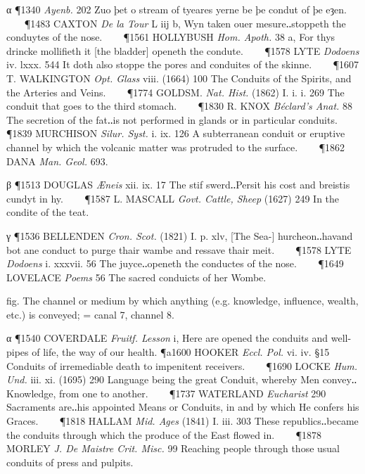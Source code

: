 \begin{description}[wide, labelwidth=!, labelindent=0pt]
\begin{myenumerate}
\noindent α \P 1340  \textit{Ayenb.} 202 Zuo þet o stream of tyeares yerne be þe condut of þe eȝen.    
\P 1483 CAXTON  \textit{De la Tour} L iij b, Wyn taken ouer mesure‥stoppeth the conduytes of the nose.    
\P 1561 HOLLYBUSH  \textit{Hom. Apoth.} 38 a, For thys drincke mollifieth it [the bladder] openeth the condute.    
\P 1578 LYTE  \textit{Dodoens} iv. lxxx. 544 It doth also stoppe the pores and conduites of the skinne.    
\P 1607 T. WALKINGTON  \textit{Opt. Glass} viii. (1664) 100 The Conduits of the Spirits, and the Arteries and Veins.    
\P 1774 GOLDSM.  \textit{Nat. Hist.} (1862) I. i. i. 269 The conduit that goes to the third stomach.    
\P 1830 R. KNOX  \textit{Béclard's Anat.} 88 The secretion of the fat‥is not performed in glands or in particular conduits.    
\P 1839 MURCHISON  \textit{Silur. Syst.} i. ix. 126 A subterranean conduit or eruptive channel by which the volcanic matter was protruded to the surface.    
\P 1862 DANA  \textit{Man. Geol.} 693.

\noindent β \P 1513 DOUGLAS  \textit{Æneis} xii. ix. 17 The stif swerd‥Persit his cost and breistis cundyt in hy.    
\P 1587 L. MASCALL  \textit{Govt. Cattle, Sheep} (1627) 249 In the condite of the teat.

\noindent γ \P 1536 BELLENDEN  \textit{Cron. Scot.} (1821) I. p. xlv, [The Sea-] hurcheon‥havand bot ane conduct to purge thair wambe and ressave thair meit.    
\P 1578 LYTE  \textit{Dodoens} i. xxxvii. 56 The juyce‥openeth the conductes of the nose.    
\P 1649 LOVELACE  \textit{Poems} 56 The sacred conduicts of her Wombe.

 fig. The channel or medium by which anything (e.g. knowledge, influence, wealth, etc.) is conveyed; = canal 7, channel 8.

\noindent α \P 1540 COVERDALE  \textit{Fruitf. Lesson} i, Here are opened the conduits and well-pipes of life, the way of our health.
\P a1600 HOOKER  \textit{Eccl. Pol.} vi. iv. §15 Conduits of irremediable death to impenitent receivers.    
\P 1690 LOCKE  \textit{Hum. Und.} iii. xi. (1695) 290 Language being the great Conduit, whereby Men convey‥Knowledge, from one to another.    
\P 1737 WATERLAND  \textit{Eucharist} 290 Sacraments are‥his appointed Means or Conduits, in and by which He confers his Graces.    
\P 1818 HALLAM  \textit{Mid. Ages} (1841) I. iii. 303 These republics‥became the conduits through which the produce of the East flowed in.    
\P 1878 MORLEY  \textit{J. De Maistre Crit. Misc.} 99 Reaching people through those usual conduits of press and pulpits.


\end{myenumerate}
\end{description}
